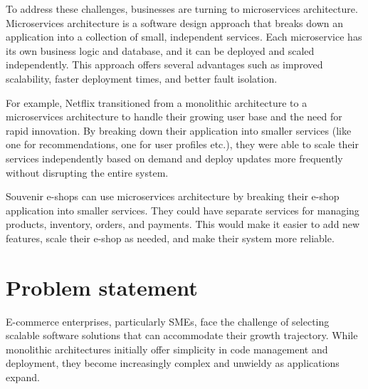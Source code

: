 To address these challenges, businesses are turning to microservices architecture. Microservices architecture is a software design approach that breaks down an application into a collection of small, independent services. Each microservice has its own business logic and database, and it can be deployed and scaled independently. This approach offers several advantages such as improved scalability, faster deployment times, and better fault isolation.

For example, Netflix transitioned from a monolithic architecture to a microservices architecture to handle their growing user base and the need for rapid innovation. By breaking down their application into smaller services (like one for recommendations, one for user profiles etc.), they were able to scale their services independently based on demand and deploy updates more frequently without disrupting the entire system.

Souvenir e-shops can use microservices architecture by breaking their e-shop application into smaller services. They could have separate services for managing products, inventory, orders, and payments. This would make it easier to add new features, scale their e-shop as needed, and make their system more reliable.
\section{Problem statement}
E-commerce enterprises, particularly SMEs, face the challenge of selecting scalable software solutions that can accommodate their growth trajectory. While monolithic architectures initially offer simplicity in code management and deployment, they become increasingly complex and unwieldy as applications expand.


